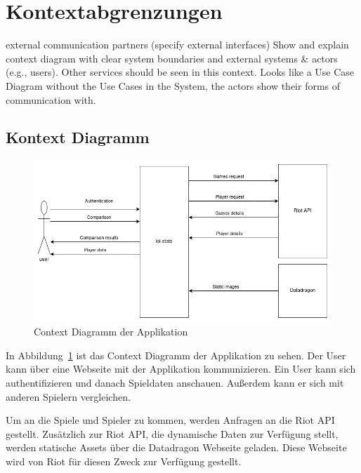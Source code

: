 \section{Kontextabgrenzungen}
external communication partners (specify external interfaces)
Show and explain context diagram with clear system boundaries and external systems \& actors (e.g., users). Other services should be seen in this context. Looks like a Use Case Diagram without the Use Cases in the System, the actors show their forms of communication with.

\subsection{Kontext Diagramm}

\begin{figure}
    \centering
    \includegraphics[width=\textwidth]{images/03-context-diagram}
    \caption{Context Diagramm der Applikation}
    \label{fig:context-diagram}
\end{figure}

In Abbildung~\ref{fig:context-diagram} ist das Context Diagramm der Applikation zu sehen.
Der User kann über eine Webseite mit der Applikation kommunizieren.
Ein User kann sich authentifizieren und danach Spieldaten anschauen.
Außerdem kann er sich mit anderen Spielern vergleichen.

Um an die Spiele und Spieler zu kommen, werden Anfragen an die Riot API gestellt.
Zusätzlich zur Riot API, die dynamische Daten zur Verfügung stellt, werden statische Assets über die Datadragon
Webseite geladen.
Diese Webseite wird von Riot für diesen Zweck zur Verfügung gestellt.

